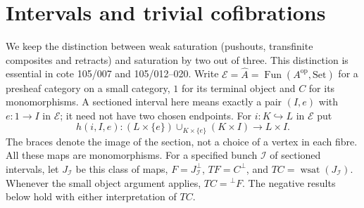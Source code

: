 \section{Intervals and trivial cofibrations}\label{sec:B}

We keep the distinction between weak saturation (pushouts, transfinite
composites and retracts) and saturation by two out of three.  This distinction
is essential in cote 105/007 and 105/012--020.  Write
$\mathscr E=\widehat A=\operatorname{Fun}(A^{\mathrm{op}},\mathrm{Set})$
for a presheaf category on a small category, $1$ for its terminal object and
$C$ for its monomorphisms.  A sectioned interval here means exactly a pair
$(I,e)$ with $e:1\to I$ in $\mathscr E$; it need not have two chosen endpoints.
For $i:K\hookrightarrow L$ in $\mathscr E$ put
\[
 h(i,I,e): (L\times\{e\})\cup_{K\times\{e\}}(K\times I)
              \longrightarrow L\times I .
\]
The braces denote the image of the section, not a choice of a vertex in each
fibre.  All these maps are monomorphisms.  For a specified bunch $\mathcal I$
of sectioned intervals, let $J_{\mathcal I}$ be this class of maps,
$F=J_{\mathcal I}^{\perp}$, $TF=C^{\perp}$, and
$TC=\operatorname{wsat}(J_{\mathcal I})$.  Whenever the small object argument
applies, $TC={}^{\perp}F$.  The negative results below hold with either
interpretation of $TC$.

